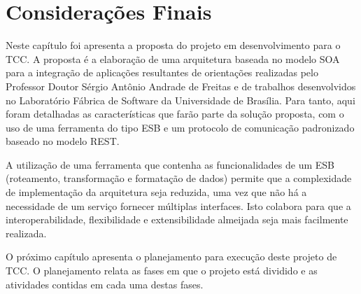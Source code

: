 \section{Considerações Finais}
Neste capítulo foi apresenta a proposta do projeto em desenvolvimento para o TCC. A proposta é a elaboração de uma arquitetura baseada no modelo SOA para a integração de aplicações resultantes de orientações realizadas pelo Professor Doutor Sérgio Antônio Andrade de Freitas e de trabalhos desenvolvidos no Laboratório Fábrica de Software da Universidade de Brasília. Para tanto, aqui foram detalhadas as características que farão parte da solução proposta, com o uso de uma ferramenta do tipo ESB e um protocolo de comunicação padronizado baseado no modelo REST.

A utilização de uma ferramenta que contenha as funcionalidades de um ESB (roteamento, transformação e formatação de dados) permite que a complexidade de implementação da arquitetura seja reduzida, uma vez que não há a necessidade de um serviço fornecer múltiplas interfaces. Isto colabora para que a interoperabilidade, flexibilidade e extensibilidade almeijada seja mais facilmente realizada.

O próximo capítulo apresenta o planejamento para execução deste projeto de TCC. O planejamento relata as fases em que o projeto está dividido e as atividades contidas em cada uma destas fases. 
